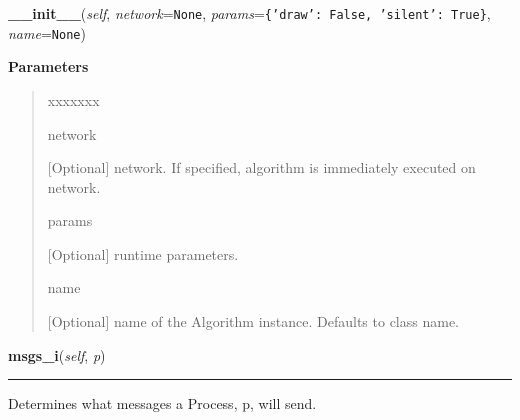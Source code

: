 \hspace{.8\funcindent}\begin{boxedminipage}{\funcwidth}

    \raggedright \textbf{\_\_init\_\_}(\textit{self}, \textit{network}={\tt None}, \textit{params}={\tt \texttt{\{}\texttt{'}\texttt{draw}\texttt{'}\texttt{: }False\texttt{, }\texttt{'}\texttt{silent}\texttt{'}\texttt{: }True\texttt{\}}}, \textit{name}={\tt None})

\setlength{\parskip}{2ex}
\setlength{\parskip}{1ex}
      \textbf{Parameters}
      \vspace{-1ex}

      \begin{quote}
        \begin{Ventry}{xxxxxxx}

          \item[network]

          [Optional] network. If specified, algorithm is immediately 
          executed on network.

          \item[params]

          [Optional] runtime parameters.

          \item[name]

          [Optional] name of the Algorithm instance. Defaults to class 
          name.

        \end{Ventry}

      \end{quote}

    \end{boxedminipage}

    \label{datk:core:distalgs:Algorithm:msgs_i}

    \vspace{0.5ex}

\hspace{.8\funcindent}\begin{boxedminipage}{\funcwidth}

    \raggedright \textbf{msgs\_i}(\textit{self}, \textit{p})

    \vspace{-1.5ex}

    \rule{\textwidth}{0.5\fboxrule}
\setlength{\parskip}{2ex}
    Determines what messages a Process, p, will send.

\setlength{\parskip}{1ex}
    \end{boxedminipage}


